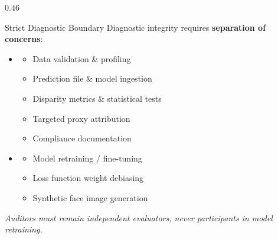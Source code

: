 \begin{frame}
\begin{columns}[T]
    \begin{column}{0.46\textwidth}
      \begin{alertcard}{Strict Diagnostic Boundary}
        \scriptsize Diagnostic integrity requires \textbf{separation of concerns}:
        \vspace{0.05cm}
        \begin{itemize}\scriptsize
          \item {}
            \begin{itemize}\tiny
              \item Data validation \& profiling
              \item Prediction file \& model ingestion
              \item Disparity metrics \& statistical tests
              \item Targeted proxy attribution
              \item Compliance documentation
            \end{itemize}
          \item {}
            \begin{itemize}\tiny
              \item Model retraining / fine-tuning
              \item Loss function weight debiasing
              \item Synthetic face image generation
            \end{itemize}
        \end{itemize}
        \vspace{0.05cm}
        \textit{Auditors must remain independent evaluators, never participants in model retraining.}
      \end{alertcard}
    \end{column}
  \end{columns}
\end{frame}

